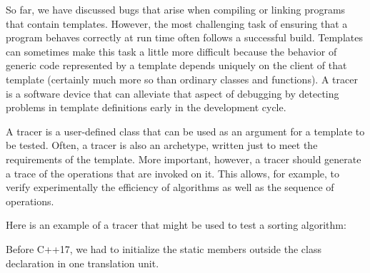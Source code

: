 So far, we have discussed bugs that arise when compiling or linking programs that contain templates. However, the most challenging task of ensuring that a program behaves correctly at run time often follows a successful build. Templates can sometimes make this task a little more difficult because the behavior of generic code represented by a template depends uniquely on the client of that template (certainly much more so than ordinary classes and functions). A tracer is a software device that can alleviate that aspect of debugging by detecting problems in template definitions early in the development cycle.

A tracer is a user-defined class that can be used as an argument for a template to be tested. Often, a tracer is also an archetype, written just to meet the requirements of the template. More important, however, a tracer should generate a trace of the operations that are invoked on it. This allows, for example, to verify experimentally the efficiency of algorithms as well as the sequence of operations.

Here is an example of a tracer that might be used to test a sorting algorithm:

\begin{tcolorbox}[colback=webgreen!5!white,colframe=webgreen!75!black]
\hspace*{0.75cm}Before C++17, we had to initialize the static members outside the class declaration in one translation unit.
\end{tcolorbox}

